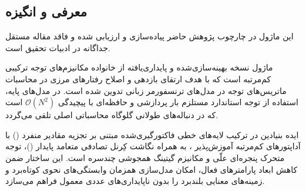 \subsection{معرفی و انگیزه}
این ماژول در چارچوب پژوهش حاضر پیاده‌سازی و ارزیابی شده و فاقد مقاله مستقل جداگانه در ادبیات تحقیق است.

ماژول  نسخه بهینه‌سازی‌شده و پایداری‌یافته از خانواده مکانیزم‌های توجه ترکیبی کم‌مرتبه  است که با هدف ارتقای بازدهی و اصلاح رفتارهای مرزی در محاسبات ماتریس‌های توجه در مدل‌های ترنسفورمر زبانی تدوین شده است. در مدل‌های پایه، استفاده از توجه استاندارد مستلزم بار پردازشی و حافظه‌ای با پیچیدگی $\mathcal{O}(N^2)$ است که در دنباله‌های طولانی گلوگاه محاسباتی اصلی تلقی می‌گردد.

ایده بنیادین در  ترکیب لایه‌های خطی فاکتورگیری‌شده مبتنی بر تجزیه مقادیر منفرد () با آداپتورهای کم‌مرتبه آموزش‌پذیر ، به همراه نگاشت کِرنل تصادفی متعامد پایدار ()، توجه متحرک پنجره‌ای علّی و مکانیزم گیتینگ همجوشی چندسره است. این ساختار ضمن کاهش ابعاد پارامترهای فعال، امکان مدل‌سازی همزمان وابستگی‌های نحوی کوتاه‌برد و زمینه‌های معنایی بلندبرد را بدون ناپایداری‌های عددی معمول فراهم می‌سازد.
